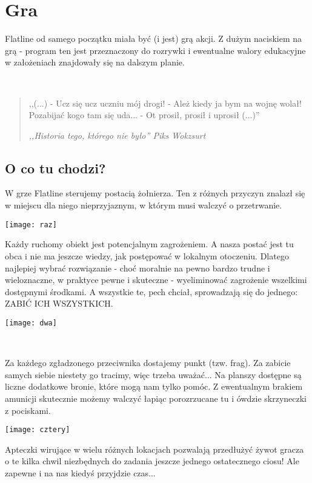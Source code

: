 \documentclass[licencjacka]{pracamgr}
\begin{document}
\chapter{Gra}\label{r:pojecia}

Flatline od samego początku miała być (i jest) grą akcji.
Z dużym naciskiem na grą - program ten jest przeznaczony do rozrywki
i ewentualne walory edukacyjne w założeniach znajdowały się na
dalszym planie.

\ \

\begin{quote}

  ,,(...)
\newline- Ucz się ucz uczniu mój drogi!
\newline- Ależ kiedy ja bym na wojnę wolał! Pozabijać kogo tam się uda...
\newline- Ot prosił, prosił i uprosił (...)''
  \ \

\raggedleft\slshape ,,Historia tego, którego nie było'' Piks Wokzsurt
\end{quote}

\section{O co tu chodzi?}

W grze Flatline sterujemy postacią żołnierza. Ten z różnych przyczyn
znalazł się w miejscu dla niego nieprzyjaznym, w którym musi walczyć
o przetrwanie.
\begin{center}
\texttt{[image: raz]}
\end{center}

Każdy ruchomy obiekt jest potencjalnym zagrożeniem. A nasza postać
jest tu obca i nie ma jeszcze wiedzy, jak postępować w lokalnym
otoczeniu. Dlatego najlepiej wybrać rozwiązanie - choć moralnie na
pewno bardzo trudne i wieloznaczne, w praktyce pewne i skuteczne -
wyeliminować zagrożenie wszelkimi dostępnymi środkami. A wszystkie
te, pech chciał, sprowadzają się do jednego: ZABIĆ ICH WSZYSTKICH.

\begin{center}
\texttt{[image: dwa]}
\end{center}

\ \

Za każdego zgładzonego przeciwnika dostajemy punkt (tzw. frag). Za zabicie samych
siebie niestety go tracimy, więc trzeba uważać... Na planszy dostępne są liczne
dodatkowe bronie, które mogą nam tylko pomóc. Z ewentualnym brakiem amunicji
skutecznie możemy walczyć łapiąc porozrzucane tu i ówdzie skrzyneczki z pociskami.
\begin{center}
\texttt{[image: cztery]}
\end{center}
Apteczki wirujące w wielu różnych lokacjach pozwalają przedłużyć
żywot gracza o te kilka chwil niezbędnych do zadania jeszcze jednego
ostatecznego ciosu! Ale zapewne i na nas kiedyś przyjdzie czas...
\end{document}
